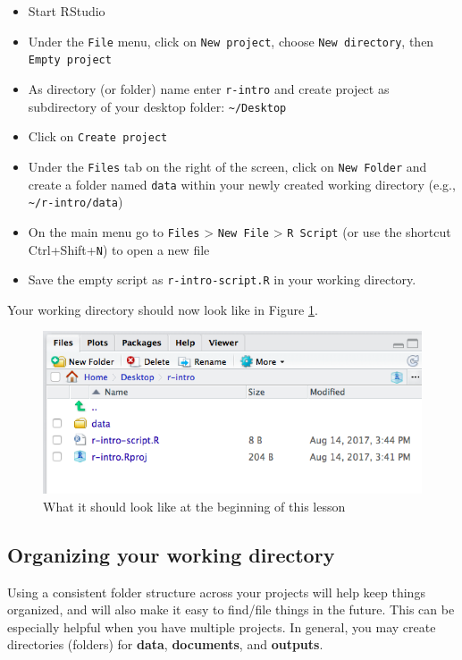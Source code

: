 \documentclass[
]{book}
\providecommand{\tightlist}{%
  \setlength{\itemsep}{0pt}\setlength{\parskip}{0pt}}
\begin{document}
\begin{itemize}
\tightlist
\item
  Start RStudio
\item
  Under the \texttt{File} menu, click on \texttt{New\ project}, choose
  \texttt{New\ directory}, then \texttt{Empty\ project}
\item
  As directory (or folder) name enter \texttt{r-intro} and create project as
  subdirectory of your desktop folder: \texttt{\textasciitilde{}/Desktop}
\item
  Click on \texttt{Create\ project}
\item
  Under the \texttt{Files} tab on the right of the screen, click on
  \texttt{New\ Folder} and create a folder named \texttt{data} within your newly
  created working directory (e.g., \texttt{\textasciitilde{}/r-intro/data})
\item
  On the main menu go to \texttt{Files} \textgreater{} \texttt{New\ File} \textgreater{} \texttt{R\ Script} (or use
  the shortcut Ctrl+Shift+\texttt{N}) to open a new file
\item
  Save the empty script as \texttt{r-intro-script.R} in your working
  directory.
\end{itemize}

Your working directory should now look like in Figure
\ref{fig:working-dir}.

\begin{figure}
\includegraphics[width=0.6\linewidth]{img/Rproject-setup} \caption{What it should look like at the beginning of this lesson}\label{fig:working-dir}
\end{figure}

\hypertarget{organizing-your-working-directory}{%
\subsection{Organizing your working directory}\label{organizing-your-working-directory}}

Using a consistent folder structure across your projects will help keep
things organized, and will also make it easy to find/file things in the
future. This can be especially helpful when you have multiple projects.
In general, you may create directories (folders) for \textbf{data},
\textbf{documents}, and \textbf{outputs}.
\end{document}

